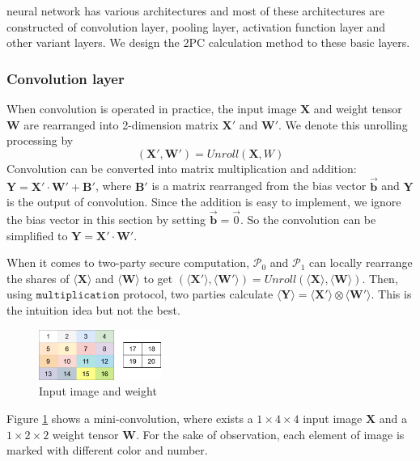 \documentclass[letterpaper]{article} %
\begin{document}
    neural network has various architectures and
    most of these architectures are constructed of convolution layer,
    pooling layer, activation function layer and other variant layers.
    We design the 2PC calculation method to these basic layers.

    \subsubsection{Convolution layer}


    When convolution is operated in practice,
    the input image $\mathbf{X}$ and weight tensor $\mathbf{W}$
    are rearranged into 2-dimension matrix $\mathbf{X}'$ and $\mathbf{W}'$.
    We denote this unrolling processing by
    $$(\mathbf{X}',\mathbf{W}')=Unroll(\mathbf{X},W)$$
    Convolution can be converted into matrix multiplication and addition:
    $\mathbf{Y}=\mathbf{X}'\cdot \mathbf{W}'+\mathbf{B}'$, where $\mathbf{B}'$ is a matrix rearranged from the bias vector $\overrightarrow{\mathbf{b}}$ and
    $\mathbf{Y}$ is the output of convolution.
    Since the addition is easy to implement, we ignore the bias vector in this section by setting $\overrightarrow{\mathbf{b}}=\overrightarrow{0}$.
    So the convolution can be simplified to $\mathbf{Y}=\mathbf{X}'\cdot \mathbf{W}'$.

    When it comes to two-party secure computation,
    $\mathcal{P}_{0}$ and $\mathcal{P}_{1}$ can locally
    rearrange the shares of $\langle \mathbf{X}\rangle$ and $\langle \mathbf{W}\rangle$ to get
    $(\langle \mathbf{X'}\rangle,\langle \mathbf{W'}\rangle)=Unroll(\langle \mathbf{X}\rangle,\langle \mathbf{W}\rangle)$.
    Then, using $\mathtt{multiplication}$ protocol,
    two parties calculate $\langle \mathbf{Y}\rangle=\langle \mathbf{X'}\rangle\otimes \langle \mathbf{W'}\rangle$.
    This is the intuition idea but not the best.

    \begin{figure}[htbp]
        \centering
        \includegraphics[width=4cm]{new_unrolling.png}
        \caption{Input image and weight}
        \label{input image and weight}
    \end{figure}

    Figure \ref{input image and weight} shows a mini-convolution,
    where exists a $1\times 4\times 4$ input image $\mathbf{X}$  and a $1\times 2\times 2$ weight tensor $\mathbf{W}$.
    For the sake of observation, each element of image is marked with different color and number.
\end{document}
